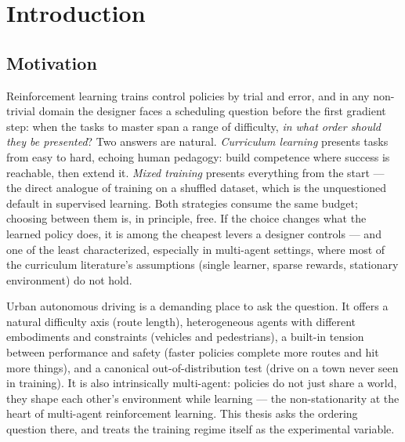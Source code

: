 \chapter{Introduction}
\label{ch:intro}

\section{Motivation}
\label{sec:motivation}

Reinforcement learning trains control policies by trial and error, and
in any non-trivial domain the designer faces a scheduling question
before the first gradient step: when the tasks to master span a range of
difficulty, \emph{in what order should they be presented}? Two answers
are natural. \emph{Curriculum learning} presents tasks from easy to
hard, echoing human pedagogy: build competence where success is
reachable, then extend it. \emph{Mixed training} presents everything
from the start --- the direct analogue of training on a shuffled
dataset, which is the unquestioned default in supervised learning. Both
strategies consume the same budget; choosing between them is, in
principle, free. If the choice changes what the learned policy does, it
is among the cheapest levers a designer controls --- and one of the
least characterized, especially in multi-agent settings, where most of
the curriculum literature's assumptions (single learner, sparse rewards,
stationary environment) do not hold.

Urban autonomous driving is a demanding place to ask the question.
It offers a natural difficulty axis (route length), heterogeneous
agents with different embodiments and constraints (vehicles and
pedestrians), a built-in tension between performance and safety
(faster policies complete more routes and hit more things), and a
canonical out-of-distribution test (drive on a town never seen in
training). It is also intrinsically multi-agent: policies do not just
share a world, they shape each other's environment while learning ---
the non-stationarity at the heart of multi-agent reinforcement
learning. This thesis asks the ordering question there, and treats the
training regime itself as the experimental variable.

